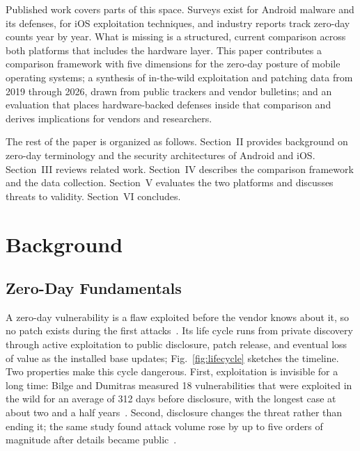 \documentclass[conference,a4paper]{IEEEtran}
\begin{document}
Published work covers parts of this space. Surveys exist for Android malware
and its defenses, for iOS exploitation techniques, and industry reports track
zero-day counts year by year. What is missing is a structured, current
comparison across both platforms that includes the hardware layer. This
paper contributes a comparison framework with five dimensions for the
zero-day posture of mobile operating systems; a synthesis of in-the-wild
exploitation and patching data from 2019 through 2026, drawn from public
trackers and vendor bulletins; and an evaluation that places hardware-backed
defenses inside that comparison and derives implications for vendors and
researchers.

The rest of the paper is organized as follows. Section~II provides background
on zero-day terminology and the security architectures of Android and iOS.
Section~III reviews related work. Section~IV describes the comparison
framework and the data collection. Section~V evaluates the two platforms and
discusses threats to validity. Section~VI concludes.

\section{Background}

\subsection{Zero-Day Fundamentals}
A zero-day vulnerability is a flaw exploited before the vendor knows about
it, so no patch exists during the first attacks~\cite{nist2022zeroday}. Its
life cycle runs from private discovery through active exploitation to public
disclosure, patch release, and eventual loss of value as the installed base
updates; Fig.~\ref{fig:lifecycle} sketches the timeline. Two properties
make this cycle dangerous. First, exploitation is
invisible for a long time: Bilge and Dumitras measured 18 vulnerabilities
that were exploited in the wild for an average of 312 days before
disclosure, with the longest case at about two and a half
years~\cite{bilge2012before}. Second, disclosure changes the threat rather
than ending it; the same study found attack volume rose by up to five
orders of magnitude after details became public~\cite{bilge2012before}.
\end{document}
